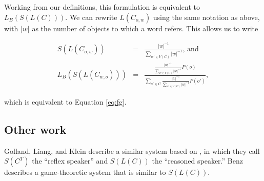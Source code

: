 Working from our definitions, this formulation is equivalent to $L_B(S(L(C)))$. We can rewrite $L(C_{o,w})$ using the same notation as above, with $|w|$ as the number of objects to which a word refers. This allows us to write 

\begin{eqnarray*}
S(L(C_{o,w})) &=& \frac{|w|^{-1}}{\displaystyle \sum_{w' \in V(C)} |w|^{-1}} \mbox{, and} \\
L_B(S(L(C_{w,o}))) &=& \frac{ \frac{\displaystyle |w|^{-1}}{\displaystyle \sum_{w' \in V(C)} |w|^{-1}}P(o)}{\displaystyle\sum_{o' \in C}  \frac{|w|^{-1}}{\displaystyle \sum_{w' \in V(C)} |w|^{-1}}P(o')},
\end{eqnarray*}

which is equivalent to Equation \ref{eq:fg}.

\subsection{Other work}

Golland, Liang, and Klein \cite{golland2010} describe a similar system based on \cite{jaegerinpress}, in which they call $S(C^T)$ the ``reflex speaker'' and $S(L(C))$ the ``reasoned speaker.'' Benz \cite{benz2005b} describes a game-theoretic system that is similar to $S(L(C))$. 


